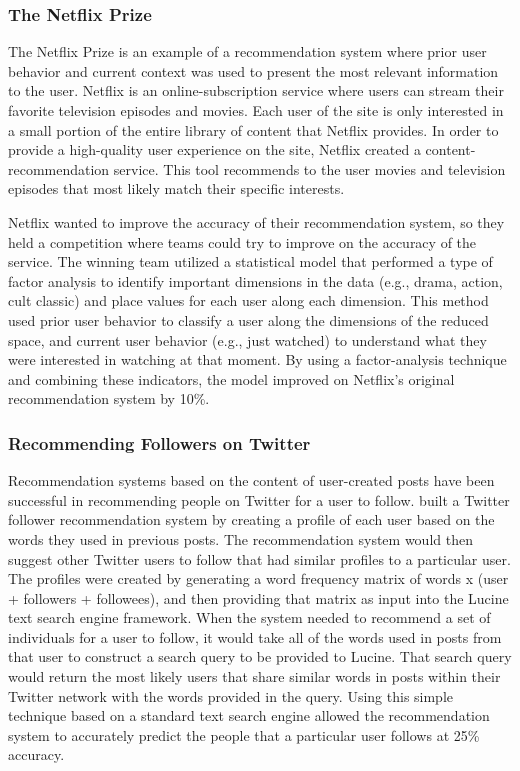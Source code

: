 \documentclass[man,floatsintext,donotrepeattitle]{apa6}
\begin{document}
\subsubsection{The Netflix Prize}

The Netflix Prize \parencite{Bennett2007} is an example of a recommendation system where prior user behavior and current context was used to present the most relevant information to the user.
Netflix is an online-subscription service where users can stream their favorite television episodes and movies.
Each user of the site is only interested in a small portion of the entire library of content that Netflix provides.
In order to provide a high-quality user experience on the site, Netflix created a content-recommendation service.
This tool recommends to the user movies and television episodes that most likely match their specific interests.

Netflix wanted to improve the accuracy of their recommendation system, so they held a competition where teams could try to improve on the accuracy of the service.
The winning team utilized a statistical model that performed a type of factor analysis to identify important dimensions in the data (e.g., drama, action, cult classic) and place values for each user along each dimension. 
This method used prior user behavior to classify a user along the dimensions of the reduced space, and current user behavior (e.g., just watched) to understand what they were interested in watching at that moment.
By using a factor-analysis technique and combining these indicators, the model improved on Netflix's original recommendation system by 10\%.

\subsubsection{Recommending Followers on Twitter}

Recommendation systems based on the content of user-created posts have been successful in recommending people on Twitter for a user to follow.
\textcite{Hannon2010} built a Twitter follower recommendation system by creating a profile of each user based on the words they used in previous posts.
The recommendation system would then suggest other Twitter users to follow that had similar profiles to a particular user.
The profiles were created by generating a word frequency matrix of words x (user + followers + followees), and then providing that matrix as input into the Lucine text search engine framework.
When the system needed to recommend a set of individuals for a user to follow, it would take all of the words used in posts from that user to construct a search query to be provided to Lucine.
That search query would return the most likely users that share similar words in posts within their Twitter network with the words provided in the query.
Using this simple technique based on a standard text search engine allowed the recommendation system to accurately predict the people that a particular user follows at 25\% accuracy.
\end{document}
